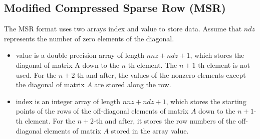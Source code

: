 \documentclass[a4paper]{article}
\begin{document}
\newpage
\subsection{Modified Compressed Sparse Row (MSR)}
The MSR format uses two arrays {\ttfamily index} and {\ttfamily value} to store data. 
Assume that $ndz$ represents the number of zero elements of the diagonal.
\begin{itemize}
\item {\ttfamily value} is a double precision array of length
      $nnz+ndz+1$, which stores the diagonal of matrix A down to the
      $n$-th element. The $n+1$-th element is not used. For the $n+2$-th
      and after, the values of the nonzero elements except the diagonal of matrix $A$ are stored along the row.
\item {\ttfamily index} is an integer array of length
      $nnz+ndz+1$, 
      which stores the starting points of the rows of the off-diagonal
      elements of matrix $A$ down to the $n+1$-th element. For the
      $n+2$-th and after, 
      it stores the row numbers of the off-diagonal elements of
      matrix $A$ stored in the array {\ttfamily value}.
\end{itemize}
\end{document}
